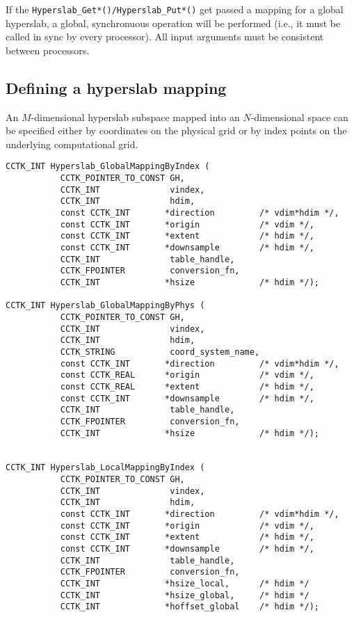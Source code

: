 \documentclass{article}
\begin{document}
If the {\tt Hyperslab\_Get*()/Hyperslab\_Put*()} get passed a mapping for a
global hyperslab, a global, synchronuous operation will be performed
(i.e., it must be called in sync by every processor). All input arguments must be
consistent between processors.


\subsection{Defining a hyperslab mapping}

An $M$-dimensional hyperslab subspace mapped into an $N$-dimensional space
can be specified either by coordinates on the physical grid or by index
points on the underlying computational grid.

\begin{verbatim}
CCTK_INT Hyperslab_GlobalMappingByIndex (
           CCTK_POINTER_TO_CONST GH,
           CCTK_INT              vindex,
           CCTK_INT              hdim,
           const CCTK_INT       *direction         /* vdim*hdim */,
           const CCTK_INT       *origin            /* vdim */,
           const CCTK_INT       *extent            /* hdim */,
           const CCTK_INT       *downsample        /* hdim */,
           CCTK_INT              table_handle,
           CCTK_FPOINTER         conversion_fn,
           CCTK_INT             *hsize             /* hdim */);

CCTK_INT Hyperslab_GlobalMappingByPhys (
           CCTK_POINTER_TO_CONST GH,
           CCTK_INT              vindex,
           CCTK_INT              hdim,
           CCTK_STRING           coord_system_name,
           const CCTK_INT       *direction         /* vdim*hdim */,
           const CCTK_REAL      *origin            /* vdim */,
           const CCTK_REAL      *extent            /* hdim */,
           const CCTK_INT       *downsample        /* hdim */,
           CCTK_INT              table_handle,
           CCTK_FPOINTER         conversion_fn,
           CCTK_INT             *hsize             /* hdim */);


CCTK_INT Hyperslab_LocalMappingByIndex (
           CCTK_POINTER_TO_CONST GH,
           CCTK_INT              vindex,
           CCTK_INT              hdim,
           const CCTK_INT       *direction         /* vdim*hdim */,
           const CCTK_INT       *origin            /* vdim */,
           const CCTK_INT       *extent            /* hdim */,
           const CCTK_INT       *downsample        /* hdim */,
           CCTK_INT              table_handle,
           CCTK_FPOINTER         conversion_fn,
           CCTK_INT             *hsize_local,      /* hdim */
           CCTK_INT             *hsize_global,     /* hdim */
           CCTK_INT             *hoffset_global    /* hdim */);


\end{verbatim}
\end{document}
